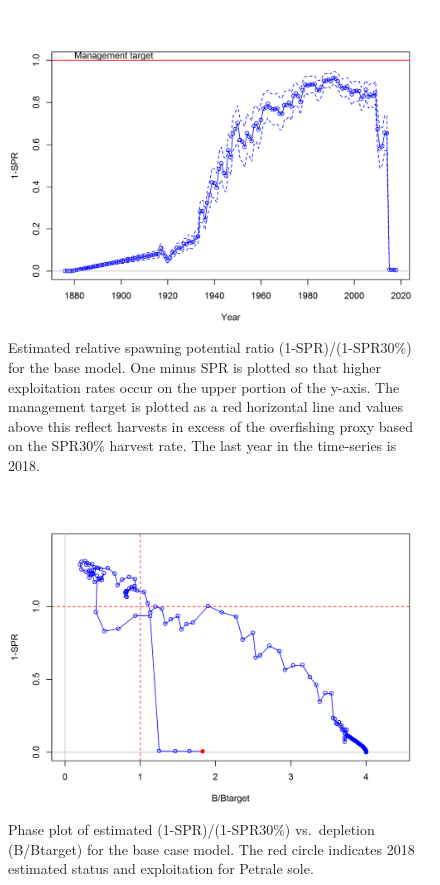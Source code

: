 \documentclass[12pt,]{article}
\begin{document}
\begin{figure}
\centering
\includegraphics{r4ss/plots_mod1/SPR3_ratiointerval.png}
\caption{Estimated relative spawning potential ratio (1-SPR)/(1-SPR30\%)
for the base model. One minus SPR is plotted so that higher exploitation
rates occur on the upper portion of the y-axis. The management target is
plotted as a red horizontal line and values above this reflect harvests
in excess of the overfishing proxy based on the SPR30\% harvest rate.
The last year in the time-series is 2018. \label{fig:SPR_all}}
\end{figure}

\begin{figure}
\centering
\includegraphics{r4ss/plots_mod1/SPR4_phase.png}
\caption{Phase plot of estimated (1-SPR)/(1-SPR30\%) vs.~depletion
(B/Btarget) for the base case model. The red circle indicates 2018
estimated status and exploitation for Petrale sole.
\label{fig:Phase_all}}
\end{figure}
\end{document}
